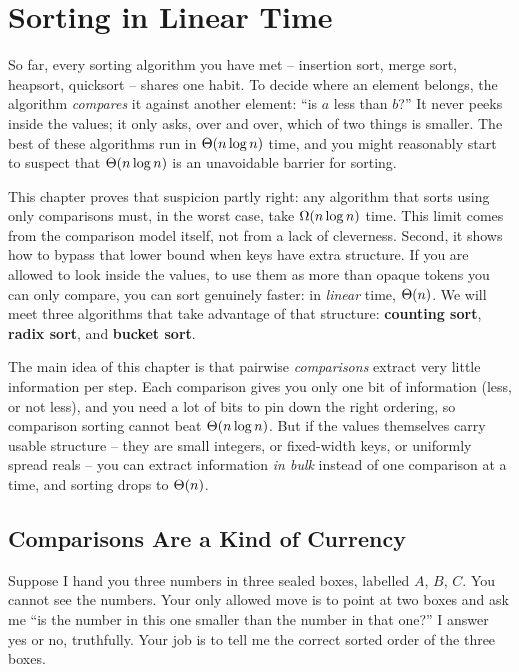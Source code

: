 \chapter{Sorting in Linear Time}

So far, every sorting algorithm you have met -- insertion sort, merge sort,
heapsort, quicksort -- shares one habit. To decide where an element belongs,
the algorithm \emph{compares} it against another element: ``is $a$ less than
$b$?'' It never peeks inside the values; it only asks, over and
over, which of two things is smaller. The best of these algorithms run in
$\Theta(n \log n)$ time, and you might reasonably start to suspect that
$\Theta(n \log n)$ is an unavoidable barrier for sorting.

This chapter proves that suspicion partly right: any algorithm that sorts using only comparisons
must, in the worst case, take $\Omega(n \log n)$ time. This limit comes
from the comparison model itself, not from a lack of cleverness.
Second, it shows how to bypass that lower bound when keys have extra structure. If you are allowed to look inside the values, to use them as more than
opaque tokens you can only compare, you can sort genuinely faster: in
\emph{linear} time, $\Theta(n)$. We will meet three algorithms that take advantage
of that structure: \textbf{counting sort}, \textbf{radix sort}, and
\textbf{bucket sort}.

\begin{focusbox}
The main idea of this chapter is that pairwise \emph{comparisons} extract very
little information per step. Each
comparison gives you only one bit of information (less, or not less), and you
need a lot of bits to pin down the right ordering, so comparison sorting cannot
beat $\Theta(n \log n)$. But if the values themselves carry usable structure --
they are small integers, or fixed-width keys, or uniformly spread reals -- you
can extract information \emph{in bulk} instead of one comparison at a time, and
sorting drops to $\Theta(n)$.
\end{focusbox}

\section{Comparisons Are a Kind of Currency}

Suppose I hand you three numbers in three sealed boxes, labelled $A$, $B$, $C$.
You cannot see the numbers. Your only allowed move is to point at two boxes and
ask me ``is the number in this one smaller than the number in that one?'' I
answer yes or no, truthfully. Your job is to tell me the correct sorted order
of the three boxes.

